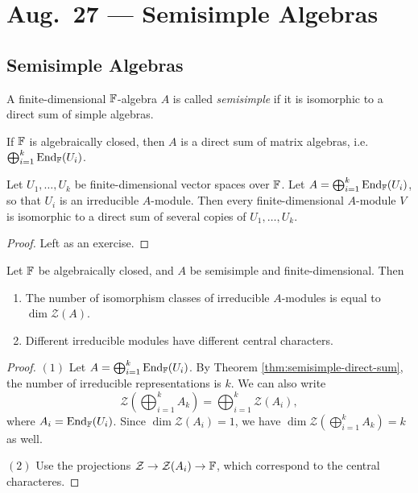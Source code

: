 \chapter{Aug.~27 --- Semisimple Algebras}

\section{Semisimple Algebras}

\begin{definition}
  A finite-dimensional $\mathbb{F}$-algebra $A$
  is called \emph{semisimple} if it
  is isomorphic to a direct sum of
  simple algebras.
\end{definition}

\begin{remark}
  If $\mathbb{F}$ is algebraically closed, then
  $A$ is a direct sum of matrix
  algebras, i.e.
  $\bigoplus_{i = 1}^k \operatorname{End}_{\mathbb{F}}(U_i)$.
\end{remark}

\begin{theorem}\label{thm:semisimple-direct-sum}
  Let $U_1, \dots, U_k$ be
  finite-dimensional vector spaces
  over $\mathbb{F}$. Let $A = \bigoplus_{i = 1}^k \operatorname{End}_{\mathbb{F}}(U_i)$,
  so that $U_i$ is an irreducible
  $A$-module. Then every finite-dimensional
  $A$-module $V$ is isomorphic to a direct
  sum of several copies of $U_1, \dots, U_k$.
\end{theorem}

\begin{proof}
  Left as an exercise.
\end{proof}

\begin{corollary}
  Let $\mathbb{F}$ be algebraically closed, and
  $A$ be semisimple and finite-dimensional.
  Then
  \begin{enumerate}
    \item The number of isomorphism
      classes of irreducible
      $A$-modules is equal to
      $\dim \mathcal{Z}(A)$.
    \item Different irreducible
      modules have different central
      characters.
  \end{enumerate}
\end{corollary}

\begin{proof}
  $(1)$
  Let $A = \bigoplus_{i = 1}^k \operatorname{End}_{\mathbb{F}}(U_i)$.
  By Theorem \ref{thm:semisimple-direct-sum},
  the number of irreducible representations
  is $k$. We can also write
  \[
    \mathcal{Z}\left(\bigoplus_{i = 1}^k A_k\right)
    = \bigoplus_{i = 1}^k \mathcal{Z}(A_i),
  \]
  where $A_i = \operatorname{End}_{\mathbb{F}}(U_i)$.
  Since $\dim \mathcal{Z}(A_i) = 1$, we
  have $\dim \mathcal{Z}(\bigoplus_{i = 1}^k A_k) = k$
  as well.
  
  $(2)$ Use the projections
  $\mathcal{Z} \to \mathcal{Z}(A_i) \to \mathbb{F}$,
  which correspond to the central characteres.
\end{proof}

